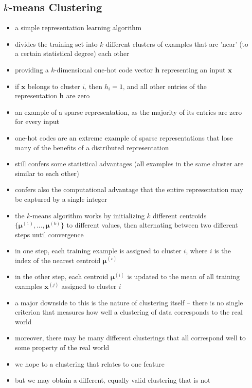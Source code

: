 \documentclass[11pt, twocolumn]{report}
\begin{document}
\subsection{$k$-means Clustering}
\begin{itemize}
  \item a simple representation learning algorithm
  \item divides the training set into $k$ different clusters of examples that
    are 'near' (to a certain statistical degree) each other
  \item providing a $k$-dimensional one-hot code vector $\bm{h}$ representing an
    input $\bm{x}$
  \item if $\bm{x}$ belongs to cluster $i$, then $h_i = 1$, and all other
    entries of the representation $\bm{h}$ are zero
  \item an example of a sparse representation, as the majority of its entries
    are zero for every input
  \item one-hot codes are an extreme example of sparse representations that lose
    many of the benefits of a distributed representation
  \item still confers some statistical advantages (all examples in the same
    cluster are similar to each other)
  \item confers also the computational advantage that the entire representation
    may be captured by a single integer
  \item the $k$-means algorithm works by initializing $k$ different centroids
    $\{\bm{\mu}^{(1)},...,\bm{\mu}^{(k)}\}$ to different values, then
    alternating between two different steps until convergence
  \item in one step, each training example is assigned to cluster $i$, where
    $i$ is the index of the nearest centroid $\bm{\mu}^{(i)}$
  \item in the other step, each centroid $\bm{\mu}^{(i)}$ is updated to the
    mean of all training examples $\bm{x}^{(j)}$ assigned to cluster $i$
  \item a major downside to this is the nature of clustering itself -- there is
    no single criterion that measures how well a clustering of data corresponds
    to the real world
  \item moreover, there may be many different clusterings that all correspond
    well to some property of the real world
  \item we hope to a clustering that relates to one feature
  \item but we may obtain a different, equally valid clustering that is not

\end{itemize}
\end{document}
